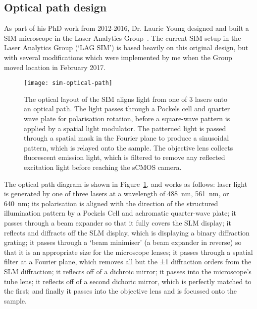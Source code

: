 \subsection{Optical path design} \label{sec:lagsim-path}
As part of his PhD work from 2012-2016, Dr. Laurie Young designed and built a SIM microscope in the Laser Analytics Group~\cite{young2016guide}. 
The current SIM setup in the Laser Analytics Group (`LAG SIM') is based heavily on this original design, but with several modifications which were implemented by me when the Group moved location in February 2017. 

\begin{figure}[p]
\centering
\texttt{[image: sim-optical-path]}
\caption[LAG SIM: Optics pattern laser light with a SIM pattern and apply polarisation rotation for optical sectioning and resolution enhancement]{The optical layout of the SIM aligns light from one of 3 lasers onto an optical path. The light passes through a Pockels cell and quarter wave plate for polarisation rotation, before a square-wave pattern is applied by a spatial light modulator. The patterned light is passed through a spatial mask in the Fourier plane to produce a sinusoidal pattern, which is relayed onto the sample. The objective lens collects fluorescent emission light,  which is filtered to remove any reflected excitation light before reaching the sCMOS camera.}
\label{fig:SIMpath}
\end{figure}

The optical path diagram is shown in Figure~\ref{fig:SIMpath}, and works as follows: laser light is generated by one of three lasers at a wavelength of \SI{488}{\nano\metre}, \SI{561}{\nano\metre}, or \SI{640}{\nano\metre}; its polarisation is aligned with the direction of the structured illumination pattern by a Pockels Cell and achromatic quarter-wave plate; it passes through a beam expander so that it fully covers the SLM display; it reflects and diffracts off the SLM display, which is displaying a binary diffraction grating; it passes through a `beam minimiser' (a beam expander in reverse) so that it is an appropriate size for the microscope lenses; it passes through a spatial filter at a Fourier plane, which removes all but the ±1 diffraction orders from the SLM diffraction; it reflects off of a dichroic mirror; it passes into the microscope's tube lens; it reflects off of a second dichoric mirror, which is perfectly matched to the first; and finally it passes into the objective lens and is focussed onto the sample. 

